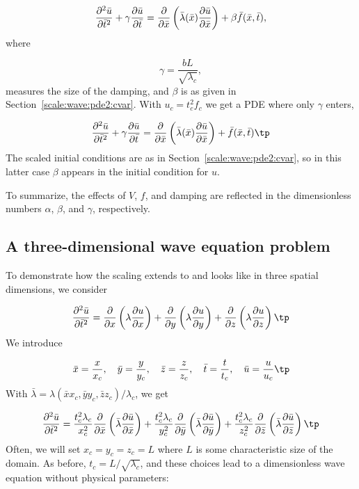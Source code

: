 \documentclass[graybox,envcountchap,sectrefs,final]{svmonodo}
\begin{document}
\begin{equation}
\frac{\partial^2 \bar u}{\partial \bar t^2}
+ \gamma\frac{\partial \bar u}{\partial \bar t} =
\frac{\partial}{\partial \bar x}\left(
\bar \lambda(\bar x) {\partial\bar u\over\partial\bar x}\right) +
\beta\bar f(\bar x,\bar t),
\end{equation}
where

\[ \gamma = \frac{bL}{\sqrt{\lambda_c}}, \]
measures the size of the damping, and $\beta$ is as given
in Section~\ref{scale:wave:pde2:cvar}.
With $u_c=t_c^2f_c$ we get a PDE where only $\gamma$ enters,

\begin{equation}
\frac{\partial^2 \bar u}{\partial \bar t^2}
+ \gamma\frac{\partial \bar u}{\partial \bar t} =
\frac{\partial}{\partial \bar x}\left(
\bar \lambda(\bar x) {\partial\bar u\over\partial\bar x}\right) +
\bar f(\bar x,\bar t)\tp
\end{equation}
The scaled initial conditions are as in
Section~\ref{scale:wave:pde2:cvar}, so in this latter case
$\beta$ appears in the initial condition for $u$.

To summarize, the effects of $V$, $f$, and damping are reflected in
the dimensionless numbers $\alpha$, $\beta$, and $\gamma$,
respectively.

\subsection{A three-dimensional wave equation problem}

To demonstrate how the scaling extends to and looks like in
three spatial dimensions, we consider

\begin{equation}
\frac{\partial^2 \bar u}{\partial \bar t^2} =
\frac{\partial}{\partial x}\left(\lambda\frac{\partial u}{\partial x}\right)+
\frac{\partial}{\partial y}\left(\lambda\frac{\partial u}{\partial y}\right)+
\frac{\partial}{\partial z}\left(\lambda\frac{\partial u}{\partial z}\right)\tp
\end{equation}
We introduce

\[ \bar x = \frac{x}{x_c},\quad \bar y = \frac{y}{y_c},
   \quad \bar z = \frac{z}{z_c},
   \quad \bar t = \frac{t}{t_c}, \quad \bar u =\frac{u}{u_c}\tp\]
With $\bar\lambda = \lambda(\bar xx_c, \bar y y_c, \bar z z_c)/\lambda_c$,
we get

\[
\frac{\partial^2 \bar u}{\partial \bar t^2} =
\frac{t_c^2\lambda_c}{x_c^2}\frac{\partial}{\partial \bar x}\left(\bar\lambda\frac{\partial \bar u}{\partial \bar x}\right)+
\frac{t_c^2\lambda_c}{y_c^2}\frac{\partial}{\partial \bar y}\left(\bar\lambda\frac{\partial \bar u}{\partial \bar y}\right)+
\frac{t_c^2\lambda_c}{z_c^2}\frac{\partial}{\partial \bar z}\left(\bar\lambda\frac{\partial \bar u}{\partial \bar z}\right)\tp
\]
Often, we will set $x_c=y_c=z_c=L$ where $L$ is some characteristic
size of the domain.
As before, $t_c = L/\sqrt{\lambda_c}$, and these choices lead to a
dimensionless wave equation without physical parameters:
\end{document}
